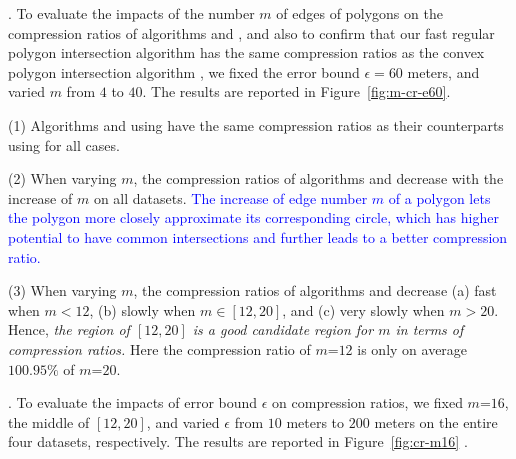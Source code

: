 {%
.
To evaluate the impacts of the number $m$ of edges of polygons on the compression ratios of algorithms \cist and \cista, and also to confirm that our fast regular polygon intersection algorithm \rpia has the same compression ratios as the convex polygon intersection algorithm \cpia,
we fixed the error bound {$\epsilon =60$ meters}, and varied $m$ from $4$ to $40$. The results are reported in Figure~\ref{fig:m-cr-e60}.

\ni(1) Algorithms \cist and \cista using \rpia have the same compression ratios as their counterparts using \cpia for all cases.

\ni(2) When varying $m$, the compression ratios of algorithms
{\cist and \cista} decrease with the increase of $m$ on all datasets.
\textcolor{blue}{The increase of edge number $m$ of a polygon lets the polygon more closely approximate its corresponding circle, which has higher potential to have common intersections and further leads to a better compression ratio.}


\ni(3) When varying $m$, the compression ratios of algorithms {\cist and \cista} decrease (a) fast when $m < 12$, (b) slowly when $m \in [12, 20]$, and (c) very slowly when $m > 20$. Hence, \emph{the region of $[12, 20]$ is a good candidate region for $m$ in terms of compression ratios.}
Here the compression ratio of $m$=$12$ is only on average {$100.95\%$} of $m$=$20$.




.
To evaluate the impacts of error bound $\epsilon$ on compression ratios, we fixed {$m$=$16$}, the middle of $[12, 20]$, and varied $\epsilon$ from $10$ meters to $200$ meters on the entire four datasets, respectively.
The results are reported in Figure~\ref{fig:cr-m16} .


}
